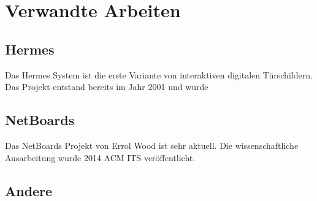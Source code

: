 \chapter{Verwandte Arbeiten}
\section{Hermes}
Das Hermes System ist die erste Variante von interaktiven digitalen Türschildern. Das Projekt entstand bereits im Jahr 2001 und wurde  
\section{NetBoards}
Das NetBoards Projekt von Errol Wood\cite{wood:2014} ist sehr aktuell. Die wissenschaftliche Ausarbeitung wurde 2014 ACM ITS veröffentlicht. 


\section{Andere}

% 
% 

